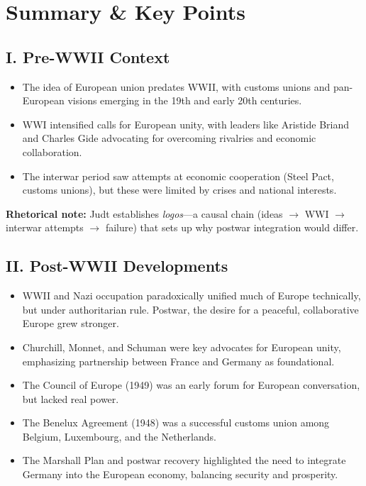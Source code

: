 \documentclass[11pt,a4paper]{article}
\begin{document}
\section*{Summary \& Key Points}

\subsection*{I. Pre-WWII Context}

\begin{itemize}
\item The idea of European union predates WWII, with customs unions and pan-European visions emerging in the 19th and early 20th centuries.
\item WWI intensified calls for European unity, with leaders like Aristide Briand and Charles Gide advocating for overcoming rivalries and economic collaboration.
\item The interwar period saw attempts at economic cooperation (Steel Pact, customs unions), but these were limited by crises and national interests.
\end{itemize}

\textbf{Rhetorical note:} Judt establishes \textit{logos}---a causal chain (ideas $\to$ WWI $\to$ interwar attempts $\to$ failure) that sets up why postwar integration would differ.

\subsection*{II. Post-WWII Developments}

\begin{itemize}
\item WWII and Nazi occupation paradoxically unified much of Europe technically, but under authoritarian rule. Postwar, the desire for a peaceful, collaborative Europe grew stronger.
\item Churchill, Monnet, and Schuman were key advocates for European unity, emphasizing partnership between France and Germany as foundational.
\item The Council of Europe (1949) was an early forum for European conversation, but lacked real power.
\item The Benelux Agreement (1948) was a successful customs union among Belgium, Luxembourg, and the Netherlands.
\item The Marshall Plan and postwar recovery highlighted the need to integrate Germany into the European economy, balancing security and prosperity.
\end{itemize}
\end{document}
